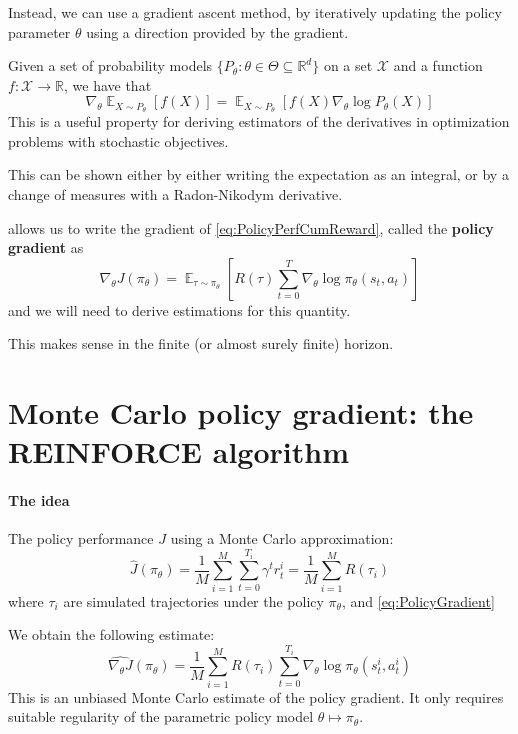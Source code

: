 \documentclass[12pt]{report}
\newcommand\RR{\mathbb{R}}
\DeclareMathOperator{\EE}{\mathbb{E}}
\newcommand{\calX}{\mathcal{X}}
\newcommand{\bluefont}{\color{Blue}}
\begin{document}
Instead, we can use a gradient ascent method, by iteratively updating the policy parameter $\theta$ using a direction provided by the gradient.

\begin{prop}\label{prop:parametricGradient}
	Given a set of probability models $\{P_\theta: \theta\in\Theta\subseteq \RR^d\}$ on a set $\calX$ and a function $f\colon \calX\to \RR$, we have that
	\[
	\nabla_\theta \EE_{X\sim P_\theta}[f(X)]
	= \EE_{X\sim P_\theta}[f(X)\nabla_\theta \log P_\theta(X)]
	\]
	This is a useful property for deriving estimators of the derivatives in optimization problems with stochastic objectives.
\end{prop}

This can be shown either by either writing the expectation as an integral, or by a change of measures with a Radon-Nikodym derivative.

 allows us to write the gradient of \eqref{eq:PolicyPerfCumReward}, called the \textbf{\bluefont policy gradient} as
\begin{equation}\label{eq:PolicyGradient}
	\nabla_\theta J(\pi_\theta) =
	\EE_{\tau\sim\pi_\theta}\left[
	R(\tau)\sum_{t=0}^T\nabla_\theta \log\pi_\theta(s_t, a_t)
	\right]
\end{equation}
and we will need to derive estimations for this quantity.

This makes sense in the finite (or almost surely finite) horizon.


\section{Monte Carlo policy gradient: the REINFORCE algorithm}

\paragraph{The idea} The policy performance $J$ using a Monte Carlo approximation:
\begin{equation}\label{eq:MCCumReward}
	\widehat{J}(\pi_\theta) = \frac{1}{M}
	\sum_{i=1}^{M}\sum_{t=0}^{T_i} \gamma^t r^i_t =
	\frac{1}{M}\sum_{i=1}^M R(\tau_i)
\end{equation}
where $\tau_i$ are simulated trajectories under the policy $\pi_\theta$, and \cref{eq:PolicyGradient} 

We obtain the following estimate:
\begin{equation}\label{eq:MCPolicyGrad}
	\widehat{\nabla_\theta J}(\pi_\theta) =
	\frac{1}{M}\sum_{i=1}^M R(\tau_i)
	\sum_{t=0}^{T_i}
	\nabla_\theta
	\log\pi_\theta(s_t^i, a_t^i)
\end{equation}
This is an unbiased Monte Carlo estimate of the policy gradient. It only requires suitable regularity of the parametric policy model $\theta \mapsto \pi_\theta$.
\end{document}
